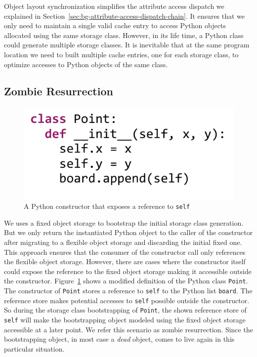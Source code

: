 Object layout synchronization simplifies the attribute access dispatch we explained in Section~\ref{sec:bg-attribute-access-dispatch-chain}.
It ensures that we only need to maintain a single valid cache entry to access Python objects allocated using the same storage class.
However, in its life time, a Python class could generate multiple storage classes.
It is inevitable that at the same program location we need to built multiple cache entries, one for each storage class, to optimize accesses to Python objects of the same class.

\subsection{Zombie Resurrection}
\label{sec:impl-zombie-resurrection}

\begin{figure}
\centering
\includegraphics[scale=.6]{figures/python-class-point-with-zombie-store-code}
\caption{A Python constructor that exposes a reference to \texttt{self}}
\label{fig:impl-python-class-point-with-zombie-store-code}
\end{figure}

We uses a fixed object storage to bootstrap the initial storage class generation.
But we only return the instantiated Python object to the caller of the constructor after migrating to a flexible object storage and discarding the initial fixed one.
This approach ensures that the consumer of the constructor call only references the flexible object storage.
However, there are cases where the constructor itself could expose the reference to the fixed object storage making it accessible outside the constructor.
Figure~\ref{fig:impl-python-class-point-with-zombie-store-code} shows a modified definition of the Python class \texttt{Point}.
The constructor of \texttt{Point} stores a reference to \texttt{self} to the Python list \texttt{board}.
The reference store makes potential accesses to \texttt{self} possible outside the constructor.
So during the storage class bootstrapping of \texttt{Point}, the shown reference store of \texttt{self} will make the bootstrapping object modeled using the fixed object storage accessible at a later point.
We refer this scenario as zombie resurrection.
Since the bootstrapping object, in most case a \emph{dead} object, comes to live again in this particular situation.

